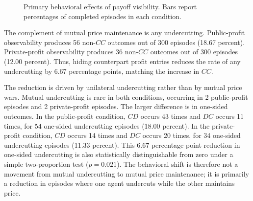 \documentclass[11pt,a4paper]{article}
\makeatletter
\renewcommand\subsection{\@startsection{subsection}{2}{\z@}{9pt}{6pt}{\normalfont\fontsize{12pt}{14pt}\bfseries}}
\makeatother
\begin{document}
\begin{figure}[H]
\centering
{}
\caption{Primary behavioral effects of payoff visibility. Bars report percentages of completed episodes in each condition.}
\label{fig:results}
\end{figure}

\subsection{Decomposition of Undercutting}
\label{sec:decomposition}

The complement of mutual price maintenance is any undercutting. Public-profit observability produces 56 non-$CC$ outcomes out of 300 episodes (18.67 percent). Private-profit observability produces 36 non-$CC$ outcomes out of 300 episodes (12.00 percent). Thus, hiding counterpart profit entries reduces the rate of any undercutting by 6.67 percentage points, matching the increase in $CC$.

The reduction is driven by unilateral undercutting rather than by mutual price wars. Mutual undercutting is rare in both conditions, occurring in 2 public-profit episodes and 2 private-profit episodes. The larger difference is in one-sided outcomes. In the public-profit condition, $CD$ occurs 43 times and $DC$ occurs 11 times, for 54 one-sided undercutting episodes (18.00 percent). In the private-profit condition, $CD$ occurs 14 times and $DC$ occurs 20 times, for 34 one-sided undercutting episodes (11.33 percent). This 6.67 percentage-point reduction in one-sided undercutting is also statistically distinguishable from zero under a simple two-proportion test ($p=0.021$). The behavioral shift is therefore not a movement from mutual undercutting to mutual price maintenance; it is primarily a reduction in episodes where one agent undercuts while the other maintains price.
\end{document}
